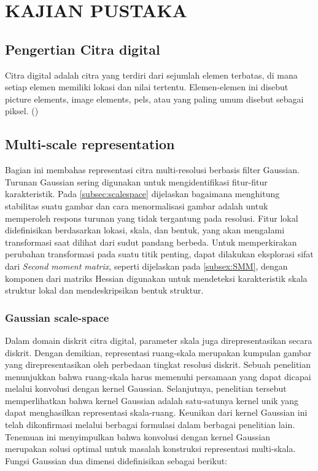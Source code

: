 
\chapter{KAJIAN PUSTAKA}

\section{Pengertian Citra digital}
Citra digital adalah citra yang terdiri dari sejumlah elemen terbatas, di mana setiap elemen memiliki lokasi dan nilai tertentu. 
Elemen-elemen ini disebut picture elements, image elements, pels, atau yang paling umum disebut sebagai piksel. (\cite{Gonzalez2018})

\section{Multi-scale representation}

  Bagian ini membahas representasi citra multi-resolusi berbasis filter Gaussian. 
Turunan Gaussian sering digunakan untuk mengidentifikasi fitur-fitur karakteristik. Pada \ref{subsec:scalespace} dijelaskan bagaimana menghitung stabilitas 
suatu gambar dan cara menormalisasi gambar adalah untuk memperoleh respons turunan yang tidak tergantung pada resolusi. 
Fitur lokal didefinisikan berdasarkan lokasi, skala, dan bentuk, yang akan mengalami transformasi saat dilihat dari sudut pandang berbeda. 
Untuk memperkirakan perubahan transformasi pada suatu titik penting, dapat dilakukan eksplorasi sifat dari \emph{Second moment matrix}, 
seperti dijelaskan pada \ref{subsex:SMM}, dengan komponen dari matriks Hessian digunakan untuk mendeteksi karakteristik skala struktur lokal dan mendeskripsikan bentuk struktur.

\subsection{Gaussian scale-space}

Dalam domain diskrit citra digital, parameter skala juga direpresentasikan secara diskrit. 
Dengan demikian, representasi ruang-skala merupakan kumpulan gambar yang direpresentasikan oleh perbedaan tingkat resolusi diskrit. 
Sebuah penelitian menunjukkan bahwa ruang-skala harus memenuhi persamaan yang dapat dicapai melalui konvolusi dengan kernel Gaussian. 
Selanjutnya, penelitian tersebut memperlihatkan bahwa kernel Gaussian adalah satu-satunya kernel unik yang dapat menghasilkan representasi skala-ruang. 
Keunikan dari kernel Gaussian ini telah dikonfirmasi melalui berbagai formulasi dalam berbagai penelitian lain. 
Tenemuan ini menyimpulkan bahwa konvolusi dengan kernel Gaussian merupakan solusi optimal untuk masalah konstruksi representasi multi-skala. Fungsi Gaussian dua dimensi didefinisikan sebagai berikut:

